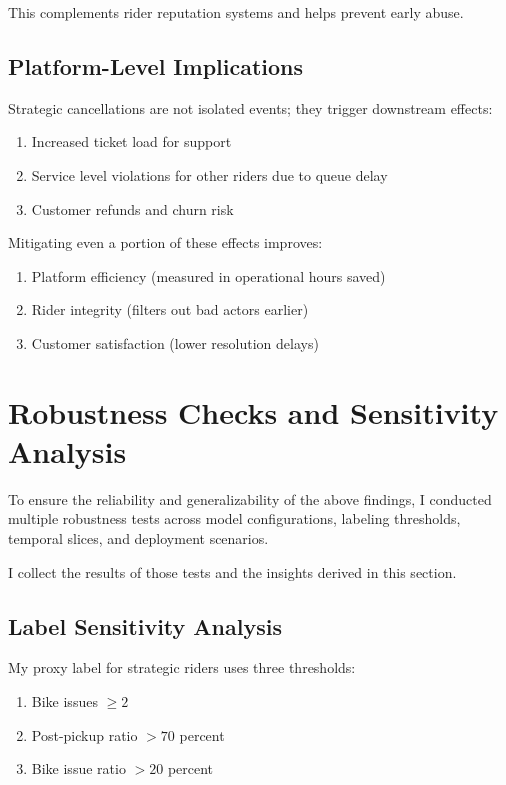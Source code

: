 \documentclass[12pt,letterpaper]{article}
\begin{document}
This complements rider reputation systems and helps prevent early abuse.

\subsection{Platform-Level Implications}

Strategic cancellations are not isolated events; they trigger downstream effects:

\begin{enumerate}
    \item Increased ticket load for support
    \item Service level violations for other riders due to queue delay
    \item Customer refunds and churn risk
\end{enumerate}

Mitigating even a portion of these effects improves:

\begin{enumerate}
    \item Platform efficiency (measured in operational hours saved)
    \item Rider integrity (filters out bad actors earlier)
    \item Customer satisfaction (lower resolution delays)
\end{enumerate}

\section{Robustness Checks and Sensitivity Analysis}

To ensure the reliability and generalizability of the above findings, I conducted multiple robustness tests across model configurations, labeling thresholds, temporal slices, and deployment scenarios.

I collect the results of those tests and the insights derived in this section.

\subsection{Label Sensitivity Analysis}

My proxy label for strategic riders uses three thresholds:

\begin{enumerate}
    \item Bike issues $\geq 2$
    \item Post-pickup ratio $> 70$ percent
    \item Bike issue ratio $> 20$ percent
\end{enumerate}
\end{document}
